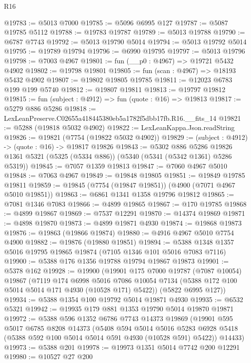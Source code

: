 \begin{lexlean}{R16}
\begin{coremodule}
@19783 := @5013 @7000
@19785 := @5096 @6995 @127
@19787 := @5087 @19785 @5112
@19788 := @19783 @19787
@19789 := @5013 @19788
@19790 := @6787 @7743
@19792 := @5013 @19790 @5014
@19794 := @5013 @19792 @5014
@19795 := @19789 @19794
@19796 := @6990 @19795
@19797 := @5013 @19796
@19798 := @7003 @4967
@19801 := fun (__p0 : @4967) => @19721 @5432 @4902
@19802 := @19798 @19801
@19805 := fun (scan : @4967) => @18193 @5432 @4902
@19807 := @19802 @19805 @19785
@19811 := @12023 @6783 @199 @199 @5740
@19812 := @19807 @19811
@19813 := @19797 @19812
@19815 := fun (subject : @4912) => fun (quote : @16) => @19813
@19817 := @5279 @886 @5286
@19818 := LexLeanPreserve.C02655a418445380eb5a1782f5dbb17fb.R16.__fits_14
@19821 := @5288 (@19818 @5032 @4902)
@19822 := LexLeanKappa.Json.readString
@19826 := @19821 (@7754 (@19822 @5032 @4902))
@19829 := (subject : @4912) -> (quote : @16) -> @19817 @19826
@19843 := @5302
    @886
    @5286
    @19826
    @1361
    @5321
    (@5325 (@5334 @886))
    (@5340 (@5341 (@5342 @1361) @5286 @5319))
@19845 := @7057 @1359 @19813
@19847 := @7060 @4967 @5010
@19848 := @7063 @4967
@19849 := @19848 @19805
@19851 := @19849 @19785 @19811
@19859 := @19845 (@7754 (@19847 @19851)) (@4900 (@7071 @4967 @5010 @19851))
@19863 := @6861 @1341 @1358 @19796 @19812
@19865 := @7081 @1346 @7083
@19866 := @4899 @19865
@19867 := @170 @19785
@19868 := @4899 @19867
@19869 := @7537 @12291
@19870 := @14374 @19869
@19871 := @4898 @19870
@19873 := @4899 @19871 @4930
@19874 := @19868 @19873
@19876 := @19863 (@19866 @19874)
@19880 := @4916 @4967 @5010 @7754 @4900
@19882 := @19876 (@19880 @19851)
@19894 := @5388 @1348 @1357 @5016 @19795 @19865 @19874 (@7105 @1346 @101 @5016 @7083 @7116)
@19900 := @5388 @176 @1356 @19788 @19794 @19867 @19873
@19901 := @5378 @162
@19928 := @19900
    (@19901
      @175
      @7000
      @19787
      (@7087 @10054)
      @19867
      (@7119
        @174
        @6998
        @5016
        @7086
        @10054
        @7134
        (@5388 @172 @100 @5014 @5014 @171 @4930 (@10528 @171) @5422))
      (@5822 @6995 @127))
@19934 := @5388 @1354 @100 @19792 @5014 @19871 @4930
@19935 := @6532 @5321
@19942 := @19935 @179 @881 @1353 @19790 @5014 @19870 @19871
@19972 := @5388
    @596
    @1352
    @6786
    @7743
    @14373
    @19869
    (@19901
      @595
      @5017
      @6785
      @8208
      @14373
      (@5408
        @594
        @5014
        @5016
        @5283
        @6928
        @5418
        (@5388 @592 @100 @5014 @5014 @591 @4930 (@10528 @591) @5422))
      @14433)
@19973 := @5388 @201
@19978 := @19973 @1351 @5014 @7742 @200 @12291
@19980 := @10527 @27 @200

\end{coremodule}
\end{lexlean}
